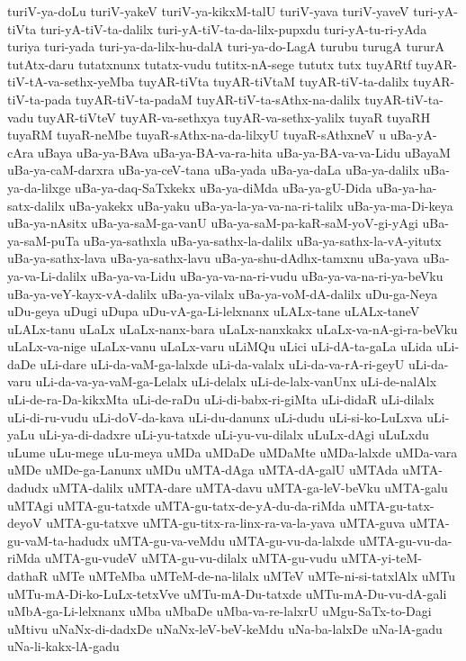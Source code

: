 {turiV-ya-doLu
turiV-yakeV
turiV-ya-kikxM-talU
turiV-yava
turiV-yaveV
turi-yA-tiVta
turi-yA-tiV-ta-dalilx
turi-yA-tiV-ta-da-lilx-pupxdu
turi-yA-tu-ri-yAda
turiya
turi-yada
turi-ya-da-lilx-hu-dalA
turi-ya-do-LagA
turubu
turugA
tururA
tutAtx-daru
tutatxnunx
tutatx-vudu
tutitx-nA-sege
tututx
tutx
tuyARtf
tuyAR-tiV-tA-va-sethx-yeMba
tuyAR-tiVta
tuyAR-tiVtaM
tuyAR-tiV-ta-dalilx
tuyAR-tiV-ta-pada
tuyAR-tiV-ta-padaM
tuyAR-tiV-ta-sAthx-na-dalilx
tuyAR-tiV-ta-vadu
tuyAR-tiVteV
tuyAR-va-sethxya
tuyAR-va-sethx-yalilx
tuyaR
tuyaRH
tuyaRM
tuyaR-neMbe
tuyaR-sAthx-na-da-lilxyU
tuyaR-sAthxneV
u
uBa-yA-cAra
uBaya
uBa-ya-BAva
uBa-ya-BA-va-ra-hita
uBa-ya-BA-va-va-Lidu
uBayaM
uBa-ya-caM-darxra
uBa-ya-ceV-tana
uBa-yada
uBa-ya-daLa
uBa-ya-dalilx
uBa-ya-da-lilxge
uBa-ya-daq-SaTxkekx
uBa-ya-diMda
uBa-ya-gU-Dida
uBa-ya-ha-satx-dalilx
uBa-yakekx
uBa-yaku
uBa-ya-la-ya-va-na-ri-talilx
uBa-ya-ma-Di-keya
uBa-ya-nAsitx
uBa-ya-saM-ga-vanU
uBa-ya-saM-pa-kaR-saM-yoV-gi-yAgi
uBa-ya-saM-puTa
uBa-ya-sathxla
uBa-ya-sathx-la-dalilx
uBa-ya-sathx-la-vA-yitutx
uBa-ya-sathx-lava
uBa-ya-sathx-lavu
uBa-ya-shu-dAdhx-tamxnu
uBa-yava
uBa-ya-va-Li-dalilx
uBa-ya-va-Lidu
uBa-ya-va-na-ri-vudu
uBa-ya-va-na-ri-ya-beVku
uBa-ya-veY-kayx-vA-dalilx
uBa-ya-vilalx
uBa-ya-voM-dA-dalilx
uDu-ga-Neya
uDu-geya
uDugi
uDupa
uDu-vA-ga-Li-lelxnanx
uLALx-tane
uLALx-taneV
uLALx-tanu
uLaLx
uLaLx-nanx-bara
uLaLx-nanxkakx
uLaLx-va-nA-gi-ra-beVku
uLaLx-va-nige
uLaLx-vanu
uLaLx-varu
uLiMQu
uLici
uLi-dA-ta-gaLa
uLida
uLi-daDe
uLi-dare
uLi-da-vaM-ga-lalxde
uLi-da-valalx
uLi-da-va-rA-ri-geyU
uLi-da-varu
uLi-da-va-ya-vaM-ga-Lelalx
uLi-delalx
uLi-de-lalx-vanUnx
uLi-de-nalAlx
uLi-de-ra-Da-kikxMta
uLi-de-raDu
uLi-di-babx-ri-giMta
uLi-didaR
uLi-dilalx
uLi-di-ru-vudu
uLi-doV-da-kava
uLi-du-danunx
uLi-dudu
uLi-si-ko-LuLxva
uLi-yaLu
uLi-ya-di-dadxre
uLi-yu-tatxde
uLi-yu-vu-dilalx
uLuLx-dAgi
uLuLxdu
uLume
uLu-mege
uLu-meya
uMDa
uMDaDe
uMDaMte
uMDa-lalxde
uMDa-vara
uMDe
uMDe-ga-Lanunx
uMDu
uMTA-dAga
uMTA-dA-galU
uMTAda
uMTA-dadudx
uMTA-dalilx
uMTA-dare
uMTA-davu
uMTA-ga-leV-beVku
uMTA-galu
uMTAgi
uMTA-gu-tatxde
uMTA-gu-tatx-de-yA-du-da-riMda
uMTA-gu-tatx-deyoV
uMTA-gu-tatxve
uMTA-gu-titx-ra-linx-ra-va-la-yava
uMTA-guva
uMTA-gu-vaM-ta-hadudx
uMTA-gu-va-veMdu
uMTA-gu-vu-da-lalxde
uMTA-gu-vu-da-riMda
uMTA-gu-vudeV
uMTA-gu-vu-dilalx
uMTA-gu-vudu
uMTA-yi-teM-dathaR
uMTe
uMTeMba
uMTeM-de-na-lilalx
uMTeV
uMTe-ni-si-tatxlAlx
uMTu
uMTu-mA-Di-ko-LuLx-tetxVve
uMTu-mA-Du-tatxde
uMTu-mA-Du-vu-dA-gali
uMbA-ga-Li-lelxnanx
uMba
uMbaDe
uMba-va-re-lalxrU
uMgu-SaTx-to-Dagi
uMtivu
uNaNx-di-dadxDe
uNaNx-leV-beV-keMdu
uNa-ba-lalxDe
uNa-lA-gadu
uNa-li-kakx-lA-gadu
}
